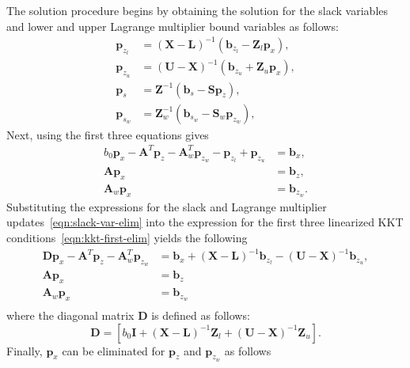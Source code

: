 \documentclass[12pt]{article}
\newcommand{\mb}{\mathbf}
\begin{document}
The solution procedure begins by obtaining the solution for the slack variables and lower and upper Lagrange multiplier bound variables as follows:
%
\begin{equation}
  \label{eqn:slack-var-elim}
  \begin{aligned}
    \mb{p}_{z_{l}} &= (\mb{X} - \mb{L})^{-1}(\mb{b}_{z_{l}} - \mb{Z}_{l} \mb{p}_{x} ), \\
    \mb{p}_{z_{u}} &= (\mb{U} - \mb{X})^{-1}(\mb{b}_{z_{u}} + \mb{Z}_{u} \mb{p}_{x} ), \\
    \mb{p}_{s} &= \mb{Z}^{-1}(\mb{b}_{s} - \mb{S}\mb{p}_{z}), \\
    \mb{p}_{s_{w}} &= \mb{Z}_{w}^{-1}(\mb{b}_{s_{w}} - \mb{S}_{w} \mb{p}_{z_{w}}),
  \end{aligned}
\end{equation}
Next, using the first three equations gives
\begin{equation}
  \label{eqn:kkt-first-elim}
  \begin{aligned}
    b_{0} \mb{p}_{x} - \mb{A}^{T}\mb{p}_{z} - \mb{A}_{w}^{T}\mb{p}_{z_{w}} - \mb{p}_{z_{l}} + \mb{p}_{z_{u}} & = \mb{b}_{x}, \\
    \mb{A} \mb{p}_{x} &= \mb{b}_{z}, \\
    \mb{A}_{w} \mb{p}_{x} & = \mb{b}_{z_{w}}.
  \end{aligned}
\end{equation}
Substituting the expressions for the slack and Lagrange multiplier updates~\eqref{eqn:slack-var-elim} into the expression for the first three linearized KKT conditions~\eqref{eqn:kkt-first-elim} yields the following
%
\begin{equation}
  \label{eqn:kkt-x-lagrange}
  \begin{aligned}
    \mb{D} \mb{p}_{x} - \mb{A}^{T}\mb{p}_{z} - \mb{A}_{w}^{T}\mb{p}_{z_{w}} &= 
    \mb{b}_{x} + (\mb{X} - \mb{L})^{-1}\mb{b}_{z_{l}} - (\mb{U} - \mb{X})^{-1}\mb{b}_{z_{u}}, \\
    \mb{A}\mb{p}_{x} &= \mb{b}_{z} \\
    \mb{A}_{w} \mb{p}_{x} & = \mb{b}_{z_{w}} \\
    \end{aligned}
\end{equation}
where the diagonal matrix $\mb{D}$ is defined as follows:
\begin{equation*}
  \mb{D} = \left[ b_{0} \mb{I} + (\mb{X} - \mb{L})^{-1}\mb{Z}_{l} + (\mb{U} - \mb{X})^{-1}\mb{Z}_{u} \right].
\end{equation*}
%
Finally, $\mb{p}_{x}$ can be eliminated for $\mb{p}_{z}$ and $\mb{p}_{z_{w}}$ as follows
\end{document}
